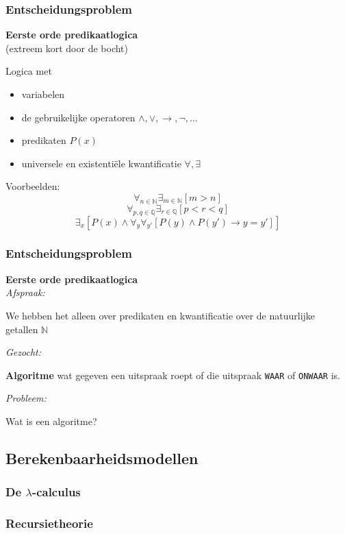 \documentclass{beamer}
\begin{document}
\begin{frame}
    \frametitle{Entscheidungsproblem}
    \textbf{Eerste orde predikaatlogica} \\
    (extreem kort door de bocht) 
    \bigskip
    
    Logica met
    \begin{itemize}
        \item variabelen
        \item de gebruikelijke operatoren $\wedge, \vee, \rightarrow, \neg, \ldots$
        \item predikaten $P(x)$
        \item universele en existentiële kwantificatie $\forall, \exists$
    \end{itemize}

    Voorbeelden:
    $$\forall_{n \in \mathbb{N}}\exists_{m \in \mathbb{N}} [m>n]$$
    $$\forall_{p, q \in \mathbb{Q}} \exists_{r \in \mathbb{Q}}  [ p < r < q]$$
    $$\exists_x [P(x)\wedge \forall_y \forall_{y'}[P(y) \wedge P(y') \rightarrow y = y']]$$
\end{frame}

\begin{frame}
    \frametitle{Entscheidungsproblem}
    \textbf{Eerste orde predikaatlogica} \\

    \emph{Afspraak:}

    We hebben het alleen over predikaten en kwantificatie over de natuurlijke getallen $\mathbb{N}$

    \vspace{1cm}

    \emph{Gezocht: }
    
    \textbf{Algoritme} wat gegeven een uitspraak roept of die uitspraak \texttt{WAAR} of \texttt{ONWAAR} is.

    \vspace{1cm}
    \emph{Probleem: }
    
    Wat is een algoritme?
\end{frame}

\subsection{Berekenbaarheidsmodellen}
\begin{frame}
    \frametitle{De $\lambda$-calculus}
\end{frame}

\begin{frame}
    \frametitle{Recursietheorie}

\end{frame}
\end{document}
